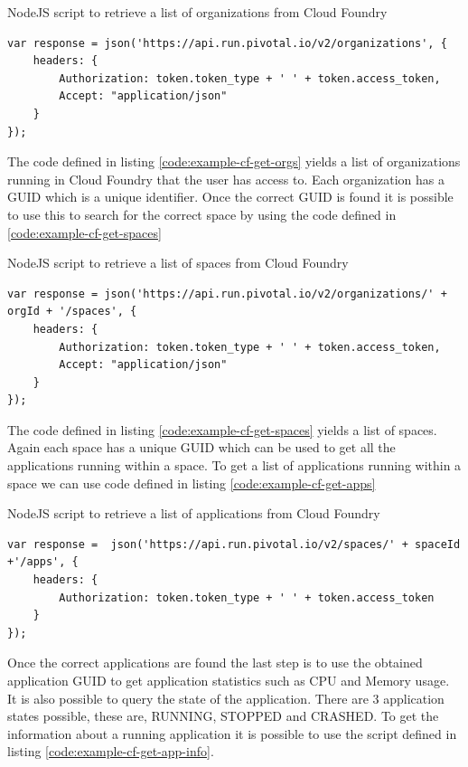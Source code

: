 \begin{listing}[H]
    \caption{NodeJS script to retrieve a list of organizations from Cloud Foundry}
    \label{code:example-cf-get-orgs}
    \begin{verbatim}
var response = json('https://api.run.pivotal.io/v2/organizations', {
    headers: {
        Authorization: token.token_type + ' ' + token.access_token,
        Accept: "application/json"
    }
});
\end{verbatim}
\end{listing}

The code defined in listing \ref{code:example-cf-get-orgs} yields a list of organizations running in Cloud Foundry that the user has access to. Each organization has a GUID which is a unique identifier. Once  the correct GUID is found it is possible to use this to search for the correct space by using the code defined in \ref{code:example-cf-get-spaces}

\begin{listing}[H]
    \caption{NodeJS script to retrieve a list of spaces from Cloud Foundry}
    \label{code:example-cf-get-spaces}
\begin{verbatim}
var response = json('https://api.run.pivotal.io/v2/organizations/' + orgId + '/spaces', {
    headers: {
        Authorization: token.token_type + ' ' + token.access_token,
        Accept: "application/json"
    }
});
\end{verbatim}
\end{listing}

The code defined in listing \ref{code:example-cf-get-spaces} yields a list of spaces. Again each space has a unique GUID which can be used to get all the applications running within a space. To get a list of applications running within a space we can use code defined in listing \ref{code:example-cf-get-apps}

\begin{listing}[H]
    \caption{NodeJS script to retrieve a list of applications from Cloud Foundry}
    \label{code:example-cf-get-apps}
\begin{verbatim}
var response =  json('https://api.run.pivotal.io/v2/spaces/' + spaceId +'/apps', {
    headers: {
        Authorization: token.token_type + ' ' + token.access_token
    }
});
\end{verbatim}
\end{listing}

Once the correct applications are found the last step is to use the obtained application GUID to get application statistics such as CPU and Memory usage. It is also possible to query the state of the application. There are 3 application states possible, these are, RUNNING, STOPPED and CRASHED. To get the information about a running application it is possible to use the script defined in listing \ref{code:example-cf-get-app-info}. 

